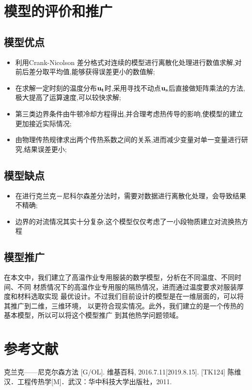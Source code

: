 \documentclass{cumcmthesis}
\begin{document}
\section{模型的评价和推广}
    \subsection{模型优点} 
        \begin{itemize}
            \item 利用Crank-Nicolson 差分格式对连续的模型进行离散化处理进行数值求解,对前后差分取平均值,能够获得误差更小的数值解;
            \item 在求解一定时刻的温度分布\(\bf{u}_t\)时,采用寻找不动点\(\bf{u}_s\)后直接做矩阵乘法的方法,极大提高了运算速度,可以较快求解;
            \item 第三类边界条件由牛顿冷却方程得出,并合理考虑热传导的影响,使模型的建立更加接近实际情况;
            \item 由物理传热规律求出两个传热系数之间的关系,进而减少变量对单一变量进行研究,结果误差更小;
        \end{itemize}
    \subsection{模型缺点}
        \begin{itemize}
            \item 在进行克兰克－尼科尔森差分法时，需要对数据进行离散化处理，会导致结果不精确;
            \item 边界的对流情况其实十分复杂,这个模型仅仅考虑了一小段物质建立对流换热方程
        \end{itemize}
    \subsection{模型推广}
        在本文中，我们建立了高温作业专用服装的数学模型，分析在不同温度、不同时间、不同
        材质情况下的高温作业专用服的隔热情况，进而通过温度要求对服装厚度和材料选取实现
        最优设计。不过我们目前设计的模型是在一维层面的，可以将其推广到二维，三维环境，
        以更符合现实情况。此外，我们建立的是一个传热的基本模型，所以可以将这个模型推广
        到其他热学问题领域。
\section{参考文献}


\begin{thebibliography}{9}%
  克兰克——尼克尔森方法 [G/OL]. 维基百科, 2016.7.11[2019.8.15].
  [TK124] 陈维汉．工程传热学[M]．武汉：华中科技大学出版社，2011.
\end{thebibliography}
\end{document}
